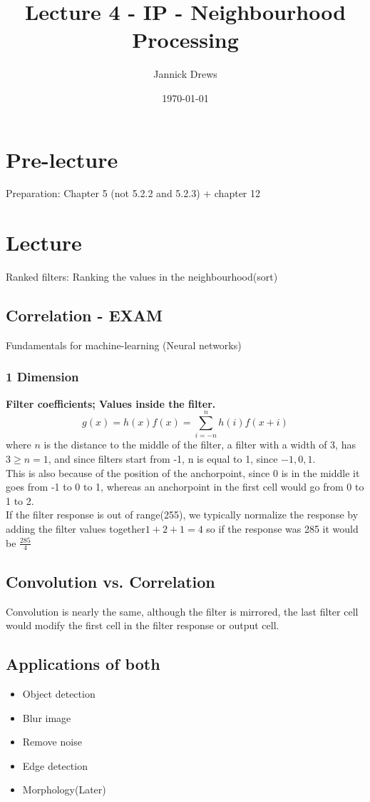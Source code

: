 \documentclass{article}
\title{Lecture 4 - IP - Neighbourhood Processing}
\author{Jannick Drews}
\date{\today}
\begin{document}
\maketitle
\newpage

\section{Pre-lecture}
Preparation: Chapter 5 (not 5.2.2 and 5.2.3) + chapter 12 \\

\section{Lecture}
Ranked filters: Ranking the values in the neighbourhood(sort)\\
\subsection{Correlation - EXAM}
Fundamentals for machine-learning (Neural networks)
\subsubsection{1 Dimension}
\textbf{Filter coefficients; Values inside the filter.}\\
$$g(x) = h(x)f(x) = \sum_{i=-n}^n h(i)f(x+i)$$
where $n$ is the distance to the middle of the filter, a filter with a width of 3, has $3 \ge n = 1$, and since filters start from -1, n is equal to 1, since $-1, 0, 1$.\\
This is also because of the position of the anchorpoint, since 0 is in the middle it goes from -1 to 0 to 1, whereas an anchorpoint in the first cell would go from 0 to 1 to 2.\\
If the filter response is out of range(255), we typically normalize the response by adding the filter values together$1+2+1 = 4$ so if the response was 285 it would be $\frac{285}{4}$\\
\subsection{Convolution vs. Correlation}
Convolution is nearly the same, although the filter is mirrored, the last filter cell would modify the first cell in the filter response or output cell.\\

\subsection{Applications of both}
\begin{itemize}
  \item Object detection
  \item Blur image
  \item Remove noise
  \item Edge detection
  \item Morphology(Later)
\end{itemize}
\end{document}
